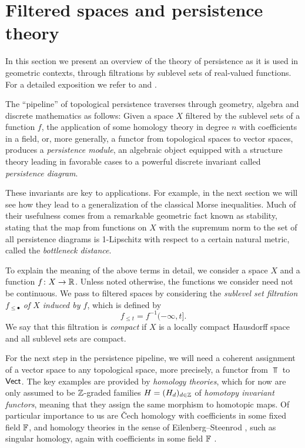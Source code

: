 
\section{Filtered spaces and persistence theory} \label{s:persistence}

In this section we present an overview of the theory of persistence as it is used in geometric contexts, through filtrations by sublevel sets of real-valued functions.
For a detailed exposition we refer to \cite{polterovich2020topological} and \cite{Chazal.2016a, MR3408277}.

The ``pipeline'' of topological persistence traverses through geometry, algebra and discrete mathematics as follows:
Given a space $X$ filtered by the sublevel sets of a function $f$, the application of some homology theory in degree $n$ with coefficients in a field,  or, more generally, a functor from topological spaces to vector spaces, produces a \textit{persistence module}, an algebraic object equipped with a structure theory leading in favorable cases to a powerful discrete invariant called \textit{persistence diagram}.

These invariants are key to applications.
For example, in the next section we will see how they lead to a generalization of the classical Morse inequalities.
Much of their usefulness comes from a remarkable geometric fact known as stability, stating that the map from functions on $X$ with the supremum norm to the set of all persistence diagrams is 1-Lipschitz with respect to a certain natural metric, called the \emph{bottleneck distance}.

To explain the meaning of the above terms in detail, we consider a space $X$ and a function $f \colon X \to \mathbb{R}$.
Unless noted otherwise, the functions we consider need not be continuous.
We pass to filtered spaces by considering the \textit{sublevel set filtration $f_{\leq \bullet}$ of $X$ induced by $f$}, which is defined by
\begin{equation*}
f_{\leq t} = f^{-1}(-\infty, t].
\end{equation*}
We say that this filtration is \textit{compact} if $X$ is a locally compact Hausdorff space and all sublevel sets are compact.

For the next step in the persistence pipeline, we will need a coherent assignment of a vector space to any topological space, more precisely, a functor from $\Top$ to $\mathsf{Vect}$.
The key examples are provided by \emph{homology theories}, which for now are only assumed to be $\mathbb{Z}$-graded families $H = (H_d)_{d \in \mathbb{Z}}$ of \emph{homotopy invariant functors}, meaning that they assign the same morphism to homotopic maps.
Of particular importance to us are \v{C}ech homology \cite[Section IX--X]{MR0050886} with coefficients in some fixed field $\mathbb{F}$, and homology theories in the sense of Eilenberg--Steenrod \cite[Section I]{MR0050886}, such as singular homology, again with coefficients in some field $\mathbb{F}$ \cite{Eilenberg.1944}.

